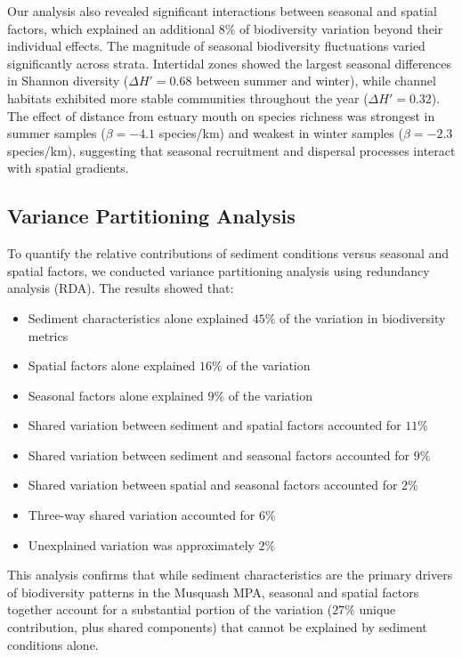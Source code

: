 \documentclass[12pt]{article}
\begin{document}
\qquad Our analysis also revealed significant interactions between seasonal and spatial factors, which explained an additional $8\%$ of biodiversity variation beyond their individual effects. The magnitude of seasonal biodiversity fluctuations varied significantly across strata. Intertidal zones showed the largest seasonal differences in Shannon diversity ($\Delta H' = 0.68$ between summer and winter), while channel habitats exhibited more stable communities throughout the year ($\Delta H' = 0.32$). The effect of distance from estuary mouth on species richness was strongest in summer samples ($\beta = -4.1$ species/km) and weakest in winter samples ($\beta = -2.3$ species/km), suggesting that seasonal recruitment and dispersal processes interact with spatial gradients.

\subsection{Variance Partitioning Analysis}

To quantify the relative contributions of sediment conditions versus seasonal and spatial factors, we conducted variance partitioning analysis using redundancy analysis (RDA). The results showed that:

\begin{itemize}

    \item Sediment characteristics alone explained $45\%$ of the variation in biodiversity metrics
    \item Spatial factors alone explained $16\%$ of the variation
    \item Seasonal factors alone explained $9\%$ of the variation
    \item Shared variation between sediment and spatial factors accounted for $11\%$
    \item Shared variation between sediment and seasonal factors accounted for $9\%$
    \item Shared variation between spatial and seasonal factors accounted for $2\%$
    \item Three-way shared variation accounted for $6\%$
    \item Unexplained variation was approximately $2\%$
\end{itemize}

This analysis confirms that while sediment characteristics are the primary drivers of biodiversity patterns in the Musquash MPA, seasonal and spatial factors together account for a substantial portion of the variation ($27\%$ unique contribution, plus shared components) that cannot be explained by sediment conditions alone.
\end{document}
